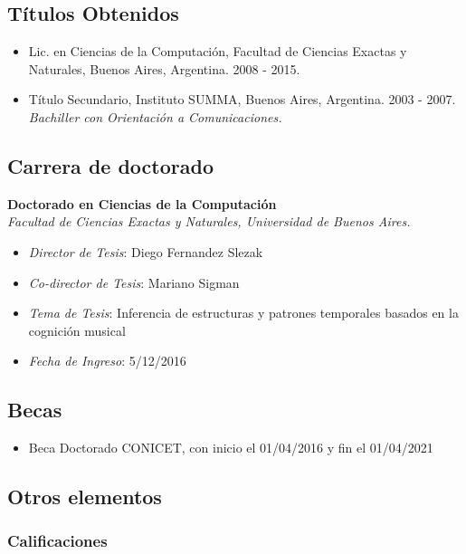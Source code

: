 \documentclass[a4paper,10pt]{article}
\begin{document}
\subsection{Títulos Obtenidos}

\begin{itemize}
    \item {Lic. en Ciencias de la Computación, Facultad de Ciencias Exactas y
        Naturales, Buenos Aires, Argentina. 2008 - 2015.}
    \item {Título Secundario, Instituto SUMMA, Buenos Aires, Argentina. 2003
            - 2007. \\
        {\small \itshape Bachiller con Orientación a Comunicaciones.}}
\end{itemize}

\subsection{Carrera de doctorado}

\textbf{Doctorado en Ciencias de la Computación}\\
\indent{}\emph{Facultad de Ciencias Exactas y Naturales, Universidad de Buenos Aires.}
\begin{itemize}
    \item \emph{Director de Tesis}: Diego Fernandez Slezak
    \item \emph{Co-director de Tesis}: Mariano Sigman
    \item \emph{Tema de Tesis}: Inferencia de estructuras y patrones temporales
        basados en la cognición musical
    \item \emph{Fecha de Ingreso}: 5/12/2016
\end{itemize}

\subsection{Becas}

\begin{itemize}
    \item Beca Doctorado CONICET, con inicio el 01/04/2016 y fin el 01/04/2021
\end{itemize}

\subsection{Otros elementos}

\subsubsection{Calificaciones}
\end{document}
